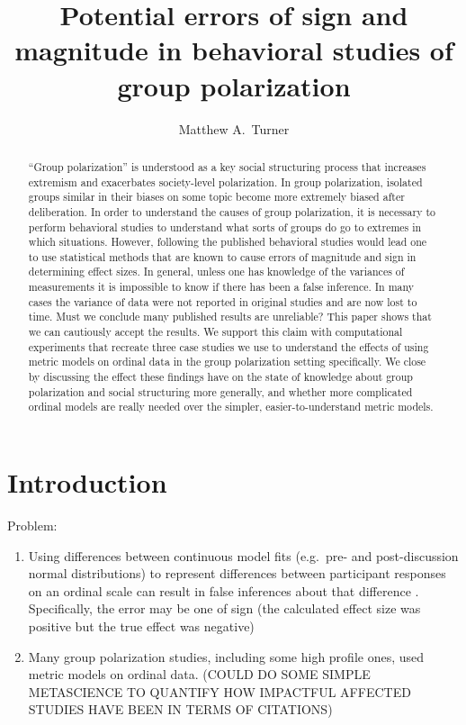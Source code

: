 \documentclass[11pt,letterpaper]{article}
\title{Potential errors of sign and magnitude in behavioral studies of group polarization}
\author{{Matthew A.~Turner}}
\begin{document}
\maketitle

\begin{abstract}
  ``Group polarization'' is understood as a key social structuring process
  that increases extremism and exacerbates society-level polarization. 
  In group polarization,
  isolated groups similar in their biases on some topic become more extremely biased after
  deliberation. In order to understand the causes of group polarization, it is 
  necessary to perform behavioral studies to understand what sorts of groups
  do go to extremes in which situations. However, following the published
  behavioral studies would lead one to use statistical methods that are known
  to cause errors of magnitude and sign in determining effect sizes. 
  In general, unless one has knowledge of the variances of measurements it is
  impossible to know if there has been a false inference. In many cases
  the variance of data were not reported in original studies and are now
  lost to time. Must we conclude many published results are unreliable? 
  This paper shows that we can cautiously accept the results. We support
  this claim with computational experiments that recreate three case studies
  we use to understand the effects of using metric models on ordinal data
  in the group polarization setting specifically. We close by discussing the
  effect these findings have on the state of knowledge about group polarization
  and social structuring more generally, and whether more complicated ordinal
  models are really needed over the simpler, easier-to-understand
  metric models.
\end{abstract}


\section{Introduction}

Problem:
\begin{enumerate}
  \item
    Using differences between 
    continuous model fits (e.g.\ pre- and post-discussion normal distributions) 
    to represent differences between participant responses on an ordinal 
    scale can result in false inferences about that difference
    \cite{Liddell2018}. Specifically, the error may be one of sign
    (the calculated effect size was positive but the true effect was negative)
  \item
    Many group polarization studies, including some 
    high profile ones, used metric models on ordinal data. 
    (COULD DO SOME SIMPLE METASCIENCE TO QUANTIFY HOW IMPACTFUL 
    AFFECTED STUDIES HAVE BEEN IN TERMS OF CITATIONS)
\end{enumerate}
\end{document}
